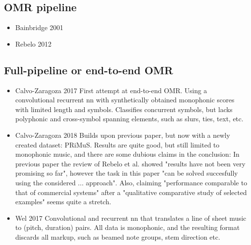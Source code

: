 \subsection{OMR pipeline}
\begin{itemize}
    \item Bainbridge 2001 \citep{Bainbridge2001} 
    \item Rebelo 2012 \citep{Rebelo2012} 
\end{itemize}

\subsection{Full-pipeline or end-to-end OMR}
\begin{itemize}
    \item Calvo-Zaragoza 2017 \citep{CalvoZaragoza2017} First attempt at end-to-end OMR. Using a convolutional recurrent nn with synthetically obtained monophonic scores with limited length and symbols. Classifies concurrent symbols, but lacks polyphonic and cross-symbol spanning elements, such as slurs, ties, text, etc.
    \item Calvo-Zaragoza 2018 \citep{CalvoZaragoza2018} Builds upon previous paper, but now with a newly created dataset: PRiMuS. Results are quite good, but still limited to monophonic music, and there are some dubious claims in the conclusion: In previous paper the review of Rebelo et al. \citep{Rebelo2012} showed "results have not been very promising so far", however the task in this paper "can be solved succesfully using the considered ... approach". Also, claiming "performance comparable to that of commercial systems" after a "qualitative comparative study of selected examples" seems quite a stretch.
    \item Wel 2017 \citep{Wel2017} Convolutional and recurrent nn that translates a line of sheet music to (pitch, duration) pairs. All data is monophonic, and the resulting format discards all markup, such as beamed note groups, stem direction etc.
\end{itemize}

